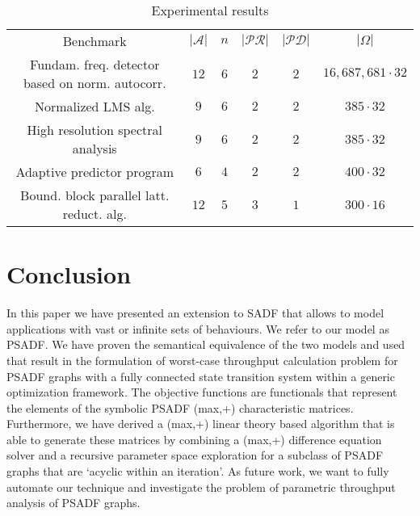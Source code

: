 \documentclass[]{eptcs}
\begin{document}
\begin{table}
\caption{Experimental results}
\begin{center}
\label{tabl:result}
\begin{tabular}{c|c|c|c|c|c}
\hline
\noalign{\smallskip}
Benchmark & $ |\mathcal{A}|$ & $n$ & $|\mathcal{PR}|$ & $|\mathcal{PD}|$ & $|\Omega|$ \\
\noalign{\smallskip}
\hline
Fundam. freq. detector based on norm. autocorr. \cite{2icts:all} & $12$ & $6$ & $2$ & $2$ & $16,687,681 \cdot 32$ \\
Normalized LMS alg. \cite{2icts:all} & $9$ & $6$ & $2$ & $2$ & $385 \cdot 32$\\
High resolution spectral analysis \cite{2icts:all} & $9$ & $6$ & $2$ & $2$ & $385 \cdot 32$\\
Adaptive predictor program \cite{2chass} & $6$ & $4$ & $2$ & $2$ & $400 \cdot 32$\\
Bound. block parallel latt. reduct. alg. \cite{2ahmad:all} & $12$ & $5$ & $3$ & $1$ & $300 \cdot 16$ \\
\hline
\end{tabular}
\end{center}
\end{table}
\section{Conclusion}
In this paper we have presented an extension to SADF that allows to model applications with vast or infinite sets of behaviours. We refer to our model as PSADF. We have proven the semantical equivalence of the two models and used that result in the formulation of worst-case throughput calculation problem for PSADF graphs with a fully connected state transition system within a generic optimization framework. The objective functions are functionals that represent the elements of the symbolic PSADF (max,+) characteristic matrices. Furthermore, we have derived a (max,+) linear theory based algorithm that is able to generate these matrices by combining a (max,+) difference equation solver and a recursive parameter space exploration for a subclass of PSADF graphs that are `acyclic within an iteration'. As future work, we want to fully automate our technique and investigate the problem of parametric throughput analysis of PSADF graphs.


\nocite{*}


\end{document}
